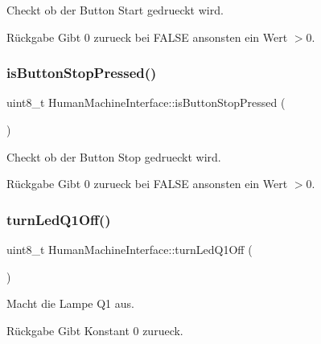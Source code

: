 Checkt ob der Button Start gedrueckt wird.

\begin{DoxyReturn}{Rückgabe}
Gibt 0 zurueck bei F\+A\+L\+SE ansonsten ein Wert $>$0. 
\end{DoxyReturn}
\hypertarget{class_human_machine_interface_a6b150a5a2978b620a3823aaeda7e80b8}{}\label{class_human_machine_interface_a6b150a5a2978b620a3823aaeda7e80b8} 
\subsubsection{\texorpdfstring{is\+Button\+Stop\+Pressed()}{isButtonStopPressed()}}
{\footnotesize\ttfamily uint8\+\_\+t Human\+Machine\+Interface\+::is\+Button\+Stop\+Pressed (\begin{DoxyParamCaption}{ }\end{DoxyParamCaption})}

Checkt ob der Button Stop gedrueckt wird.

\begin{DoxyReturn}{Rückgabe}
Gibt 0 zurueck bei F\+A\+L\+SE ansonsten ein Wert $>$0. 
\end{DoxyReturn}
\hypertarget{class_human_machine_interface_a7d696c1803928a001bb98585f2ceb138}{}\label{class_human_machine_interface_a7d696c1803928a001bb98585f2ceb138} 
\subsubsection{\texorpdfstring{turn\+Led\+Q1\+Off()}{turnLedQ1Off()}}
{\footnotesize\ttfamily uint8\+\_\+t Human\+Machine\+Interface\+::turn\+Led\+Q1\+Off (\begin{DoxyParamCaption}{ }\end{DoxyParamCaption})}

Macht die Lampe Q1 aus.

\begin{DoxyReturn}{Rückgabe}
Gibt Konstant 0 zurueck. 
\end{DoxyReturn}
\hypertarget{class_human_machine_interface_a0ba867b5493f024f53c1e00a1287aa6c}{}\label{class_human_machine_interface_a0ba867b5493f024f53c1e00a1287aa6c} 
